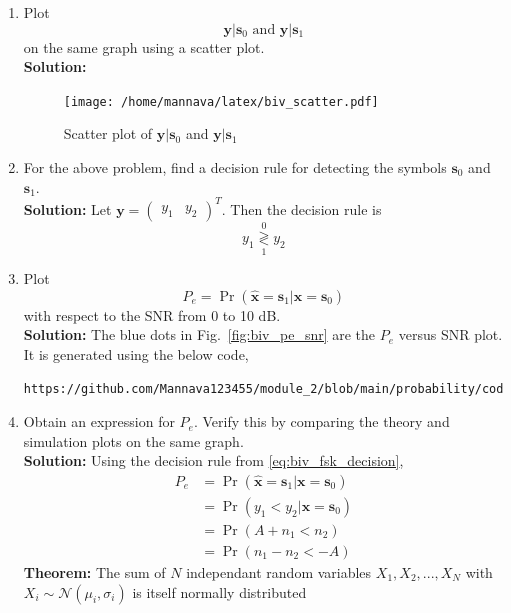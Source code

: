\documentclass[journal,10pt,twocolumn]{IEEEtran}
\newcommand\figref{Fig.~\ref}
\providecommand{\mbf}{\mathbf}
\providecommand{\pr}[1]{\ensuremath{\Pr\left(#1\right)}}
\newcommand{\solution}{\noindent \textbf{Solution: }}
\providecommand{\dec}[2]{\ensuremath{\overset{#1}{\underset{#2}{\gtrless}}}}
\newcommand{\myvec}[1]{\ensuremath{\begin{pmatrix}#1\end{pmatrix}}}
\providecommand{\gauss}[2]{\mathcal{N}\ensuremath{\left(#1,#2\right)}}
\begin{document}
\begin{enumerate}
\item
\label{ch5_fsk}
Plot 
%
\begin{equation}
\mbf{y}|\mbf{s}_0 \text{ and } \mbf{y}|\mbf{s}_1
\end{equation}
%
on the same graph using a scatter plot.\\
\solution 
%
\begin{figure}[H]
\centering
\texttt{[image: /home/mannava/latex/biv\_scatter.pdf]}
\caption{Scatter plot of $\mbf{y}|\mbf{s}_0$ and $\mbf{y}|\mbf{s}_1$ }
\label{fig:biv_scatter}
\end{figure}

%
\item
For the above problem, find a decision rule for detecting the symbols $\mbf{s}_0 $ and $\mbf{s}_1$.\\
\solution Let $\mbf{y} = \myvec{y_1&y_2}^T$. Then the decision rule is
\begin{equation}
	y_1 \dec{0}{1} y_2
	\label{eq:biv_fsk_decision}
\end{equation}
%
\item
Plot 
\begin{equation} 
P_e = \pr{\hat{\mbf{x}} = \mbf{s}_1|\mbf{x} = \mbf{s}_0}
\label{eq:prob_error_fsk}
\end{equation}
with respect to the SNR from 0 to 10 dB.\\
\solution The blue dots in \figref{fig:biv_pe_snr} are the $P_e$ versus SNR plot. It is generated using the below code,
\begin{lstlisting}
https://github.com/Mannava123455/module_2/blob/main/probability/codes/chapter_5/5_1_3.py
\end{lstlisting}
%
\item
Obtain an expression for $P_e$. Verify this by comparing the theory and simulation plots on the same graph.\\
\solution Using the decision rule from \eqref{eq:biv_fsk_decision},
\begin{align}
	\nonumber
	P_e &= \pr{\hat{\mbf{x}} = \mbf{s}_1|\mbf{x} = \mbf{s}_0}\\\nonumber
	&= \pr{y_1 < y_2|\mbf{x} = \mbf{s}_0}\\\nonumber
	&= \pr{A+n_1 < n_2}\\
	\label{eq:prob_error_fsk_inter}
	&= \pr{n_1-n_2 < -A}
\end{align}
\textbf{Theorem:} The sum of $N$ independant random variables $X_1,X_2,...,X_N$ with $X_i \sim \gauss{\mu_i}{\sigma_i}$ is itself normally distributed %

\end{enumerate}
\end{document}
